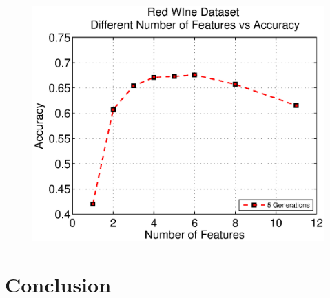 \documentclass[11pt,onecolumn,a4paper]{report}
\begin{document}
   \begin{figure}[ht]
     \includegraphics[width=0.45\linewidth]{img/winefeat2.eps}
     \label{fig:digraph}
   \end{figure}



\section{Conclusion}


{\small


}
\end{document}
